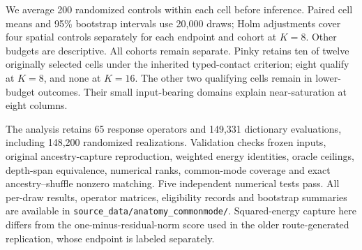 We average 200 randomized controls within each cell before inference. Paired cell means and 95\% bootstrap intervals use 20,000 draws; Holm adjustments cover four spatial controls separately for each endpoint and cohort at $K=8$. Other budgets are descriptive. All cohorts remain separate. Pinky retains ten of twelve originally selected cells under the inherited typed-contact criterion; eight qualify at $K=8$, and none at $K=16$. The other two qualifying cells remain in lower-budget outcomes. Their small input-bearing domains explain near-saturation at eight columns.

The analysis retains 65 response operators and 149,331 dictionary evaluations, including 148,200 randomized realizations. Validation checks frozen inputs, original ancestry-capture reproduction, weighted energy identities, oracle ceilings, depth-span equivalence, numerical ranks, common-mode coverage and exact ancestry--shuffle nonzero matching. Five independent numerical tests pass. All per-draw results, operator matrices, eligibility records and bootstrap summaries are available in \texttt{source\_data/anatomy\_commonmode/}. Squared-energy capture here differs from the one-minus-residual-norm score used in the older route-generated replication, whose endpoint is labeled separately.
